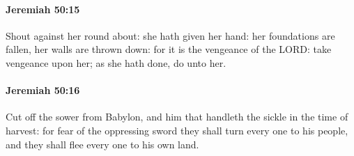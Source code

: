 		\paragraph{Jeremiah 50:15} %
			\label{JEREMIAH-50-15}

			Shout against her round about: she hath given her hand: her foundations are fallen, her walls are thrown down: for it is the vengeance of the LORD: take vengeance upon her; as she hath done, do unto her.


		\paragraph{Jeremiah 50:16} %
			\label{JEREMIAH-50-16}

			Cut off the sower from Babylon, and him that handleth the sickle in the time of harvest: for fear of the oppressing sword they shall turn every one to his people, and they shall flee every one to his own land.

